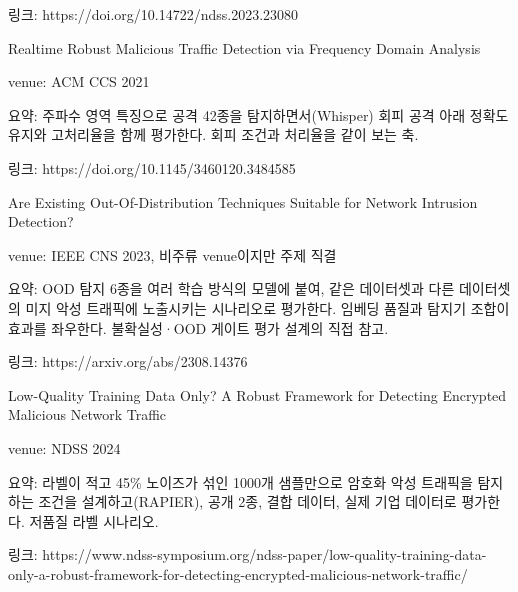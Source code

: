 \par\noindent \textbullet\enspace 링크: https:/\allowbreak{}/\allowbreak{}doi.org/\allowbreak{}10.14722/\allowbreak{}ndss.2023.23080


\par\noindent \textbullet\enspace Realtime Robust Malicious Traffic Detection via Frequency Domain Analysis


\par\noindent \textbullet\enspace venue: ACM CCS 2021


\par\noindent \textbullet\enspace 요약: 주파수 영역 특징으로 공격 42종을 탐지하면서(Whisper) 회피 공격 아래 정확도 유지와 고처리율을 함께 평가한다. 회피 조건과 처리율을 같이 보는 축.


\par\noindent \textbullet\enspace 링크: https:/\allowbreak{}/\allowbreak{}doi.org/\allowbreak{}10.1145/\allowbreak{}3460120.3484585


\par\noindent \textbullet\enspace Are Existing Out-Of-Distribution Techniques Suitable for Network Intrusion Detection?


\par\noindent \textbullet\enspace venue: IEEE CNS 2023, 비주류 venue이지만 주제 직결


\par\noindent \textbullet\enspace 요약: OOD 탐지 6종을 여러 학습 방식의 모델에 붙여, 같은 데이터셋과 다른 데이터셋의 미지 악성 트래픽에 노출시키는 시나리오로 평가한다. 임베딩 품질과 탐지기 조합이 효과를 좌우한다. 불확실성·OOD 게이트 평가 설계의 직접 참고.


\par\noindent \textbullet\enspace 링크: https:/\allowbreak{}/\allowbreak{}arxiv.org/\allowbreak{}abs/\allowbreak{}2308.14376


\par\noindent \textbullet\enspace Low-Quality Training Data Only? A Robust Framework for Detecting Encrypted Malicious Network Traffic


\par\noindent \textbullet\enspace venue: NDSS 2024


\par\noindent \textbullet\enspace 요약: 라벨이 적고 45\% 노이즈가 섞인 1000개 샘플만으로 암호화 악성 트래픽을 탐지하는 조건을 설계하고(RAPIER), 공개 2종, 결합 데이터, 실제 기업 데이터로 평가한다. 저품질 라벨 시나리오.


\par\noindent \textbullet\enspace 링크: https:/\allowbreak{}/\allowbreak{}www.ndss-symposium.org/\allowbreak{}ndss-paper/\allowbreak{}low-quality-training-data-only-a-robust-framework-for-detecting-encrypted-malicious-network-traffic/\allowbreak{}


